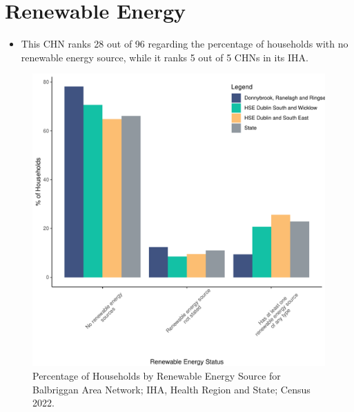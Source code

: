\documentclass{article}
\begin{document}
\section{Renewable Energy}\label{sect:RE}
\begin{itemize}
\item This CHN ranks  28 out of 96 regarding the percentage of households with no renewable energy source, while it ranks   5 out of 5 CHNs in its IHA.
\end{itemize}
\begin{figure}[H]
	\centering
	\includegraphics[width = 140mm]{../figures/RenewableEnergyED.pdf}
	\caption{Percentage of Households by Renewable Energy Source for Balbriggan Area Network; IHA, Health Region and State; Census 2022.}
	\label{fig:vbnv}
	\end{figure}
\end{document}
